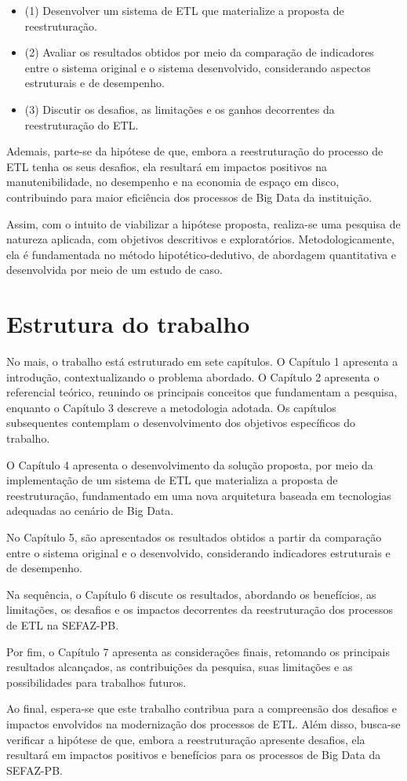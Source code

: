 \begin{itemize}
    \item (1) Desenvolver um sistema de ETL que materialize a proposta de reestruturação.
    
    \item (2) Avaliar os resultados obtidos por meio da comparação de indicadores entre o sistema 
    original e o sistema desenvolvido, considerando aspectos estruturais e de desempenho.

    \item (3) Discutir os desafios, as limitações e os ganhos decorrentes da reestruturação do ETL.
\end{itemize}


Ademais, parte-se da hipótese de que, embora a reestruturação do processo de ETL tenha os
seus desafios, ela resultará em impactos positivos na manutenibilidade, no desempenho e na
economia de espaço em disco, contribuindo para maior eficiência dos processos de Big Data da
instituição.

Assim, com o intuito de viabilizar a hipótese proposta, realiza-se uma pesquisa de natureza
aplicada, com objetivos descritivos e exploratórios. Metodologicamente, ela é fundamentada no
método hipotético-dedutivo, de abordagem quantitativa e desenvolvida por meio de um estudo de caso.

\section{Estrutura do trabalho}

No mais, o trabalho está estruturado em sete capítulos. O Capítulo 1 apresenta a introdução, 
contextualizando o problema abordado. O Capítulo 2 apresenta o referencial teórico, reunindo 
os principais conceitos que fundamentam a pesquisa, enquanto o Capítulo 3 descreve a metodologia 
adotada. Os capítulos subsequentes contemplam o desenvolvimento dos objetivos específicos do trabalho.


O Capítulo 4 apresenta o desenvolvimento da solução proposta, por meio da implementação de um 
sistema de ETL que materializa a proposta de reestruturação, fundamentado em uma nova arquitetura baseada em 
tecnologias adequadas ao cenário de Big Data.
    
No Capítulo 5, são apresentados os resultados obtidos a partir da comparação entre o sistema original 
e o desenvolvido, considerando indicadores estruturais e de desempenho.

Na sequência, o Capítulo 6 discute os resultados, abordando os benefícios, as limitações, os desafios 
e os impactos decorrentes da reestruturação dos processos de ETL na SEFAZ-PB.

Por fim, o Capítulo 7 apresenta as considerações finais, retomando os principais resultados alcançados, 
as contribuições da pesquisa, suas limitações e as possibilidades para trabalhos futuros.

Ao final, espera-se que este trabalho contribua para a compreensão dos desafios e 
impactos envolvidos na modernização dos processos de ETL. Além disso, busca-se verificar a 
hipótese de que, embora a reestruturação apresente desafios, ela resultará em impactos 
positivos e benefícios para os processos de Big Data da SEFAZ-PB.